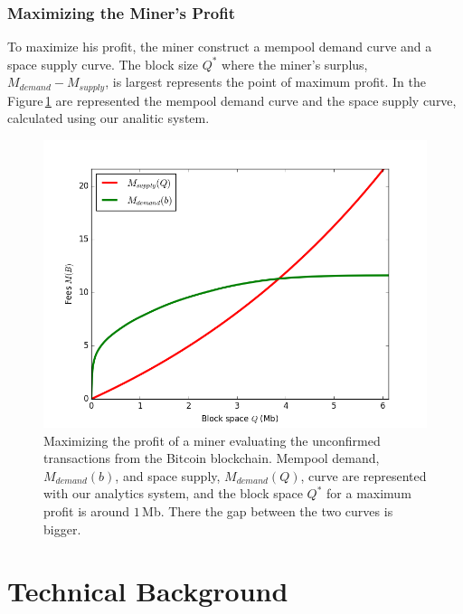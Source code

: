\documentclass[USenglish]{uit-thesis}
\begin{document}
\subsection{Maximizing the Miner's Profit}
To maximize his profit, the miner construct a mempool demand curve and a space supply curve.
The block size $Q^*$ where the miner's surplus, $M_{demand} - M_{supply}$, is largest represents
the point of maximum profit. In the Figure\,\ref{fig:mempooldemandcurve} are represented the
mempool demand curve and the space supply curve, calculated using our analitic system.

\begin{figure}[h]
	\centering
	\includegraphics[width=1\textwidth]{img/mempooldemandcurve}
	\caption{Maximizing the profit of a miner evaluating the unconfirmed transactions from the Bitcoin
	blockchain. Mempool demand, $M_{demand}(b)$, and space supply, $M_{demand}(Q)$, curve are represented
	with our analytics system, and the block space $Q^*$ for a maximum profit is around $1$\,Mb. There the
	gap between the two curves is bigger.}
	\label{fig:mempooldemandcurve}
\end{figure}
\chapter{Technical Background}
\label{chap:techback}
\end{document}
